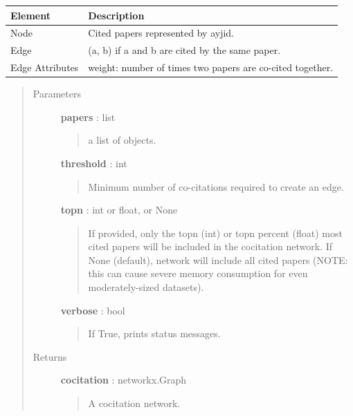 \documentclass[letterpaper,10pt,english]{sphinxmanual}
\begin{document}
\begin{fulllineitems}
\begin{tabulary}{\linewidth}{|L|L|}
\hline
\textsf{\relax 
Element
} & \textsf{\relax 
Description
}\\
\hline
Node
 & 
Cited papers represented by {\hyperref[tethne.classes.paper:tethne.classes.paper.Paper]{}} ayjid.
\\

Edge
 & 
(a, b) if a and b are cited by the same paper.
\\

Edge Attributes
 & 
weight: number of times two papers are co-cited
together.
\\
\hline\end{tabulary}

\begin{quote}\begin{description}
\item[{Parameters}] \leavevmode
\textbf{papers} : list
\begin{quote}

a list of {\hyperref[tethne.classes.paper:tethne.classes.paper.Paper]{}} objects.
\end{quote}

\textbf{threshold} : int
\begin{quote}

Minimum number of co-citations required to create an edge.
\end{quote}

\textbf{topn} : int or float, or None
\begin{quote}

If provided, only the topn (int) or topn percent (float) most cited
papers will be included in the cocitation network. If None (default),
network will include all cited papers (NOTE: this can cause severe
memory consumption for even moderately-sized datasets).
\end{quote}

\textbf{verbose} : bool
\begin{quote}

If True, prints status messages.
\end{quote}

\item[{Returns}] \leavevmode
\textbf{cocitation} : networkx.Graph
\begin{quote}

A cocitation network.
\end{quote}

\end{description}\end{quote}

\end{fulllineitems}
\end{document}
